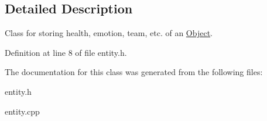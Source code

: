 \subsection{Detailed Description}
Class for storing health, emotion, team, etc. of an \hyperlink{classObject}{Object}. 

Definition at line 8 of file entity.\+h.



The documentation for this class was generated from the following files\+:\begin{DoxyCompactItemize}
\item 
entity.\+h\item 
entity.\+cpp\end{DoxyCompactItemize}
